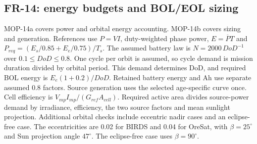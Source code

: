 \subsection{FR-14: energy budgets and BOL/EOL sizing}
MOP-14a covers power and orbital energy accounting. MOP-14b covers sizing and generation.
References use $P=VI$, duty-weighted phase power, $E=\overline P T$ and
$P_{req}=(E_s/0.85+E_e/0.75)/T_s$.
The assumed battery law is $N=2000\,DoD^{-1}$ over $0.1\le DoD\le0.8$.
One cycle per orbit is assumed, so cycle demand is mission duration divided by orbital period.
This demand determines DoD, and required BOL energy is $E_e(1+0.2)/DoD$.
Retained battery energy and Ah use separate assumed 0.8 factors.
Source generation uses the selected age-specific curve once.
Cell efficiency is $V_{mp}I_{mp}/(G_{ref}A_{cell})$.
Required active area divides source-power demand by irradiance, efficiency, the two source factors and mean sunlight projection.
Additional orbital checks include eccentric nadir cases and an eclipse-free case.
The eccentricities are 0.02 for BIRDS and 0.04 for OreSat, with $\beta=25^\circ$ and Sun projection angle $47^\circ$.
The eclipse-free case uses $\beta=90^\circ$.


